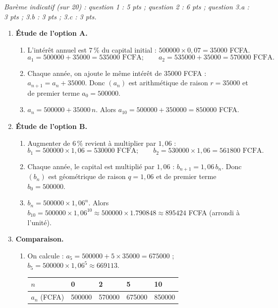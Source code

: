 \documentclass[11pt]{article}
\begin{document}
\begin{corrige}
\emph{Barème indicatif (sur 20) : question 1 : 5 pts ; question 2 : 6 pts ; question 3.a : 3 pts ; 3.b : 3 pts ; 3.c : 3 pts.}
\begin{enumerate}
\item \textbf{Étude de l'option A.}
\begin{enumerate}
\item L'intérêt annuel est $7\,\%$ du capital initial : $\num{500000}\times 0,07 = \num{35000}$ FCFA.
\[ a_1 = \num{500000} + \num{35000} = \num{535000} \text{ FCFA} ; \qquad a_2 = \num{535000} + \num{35000} = \num{570000} \text{ FCFA}. \]
\item Chaque année, on ajoute le même intérêt de \num{35000} FCFA : $a_{n+1} = a_n + \num{35000}$. Donc $(a_n)$ est arithmétique de raison $r = \num{35000}$ et de premier terme $a_0 = \num{500000}$.
\item $a_n = \num{500000} + \num{35000}\,n$. Alors $a_{10} = \num{500000} + \num{350000} = \num{850000}$ FCFA.
\end{enumerate}
\item \textbf{Étude de l'option B.}
\begin{enumerate}
\item Augmenter de $6\,\%$ revient à multiplier par $1,06$ :
\[ b_1 = \num{500000}\times 1,06 = \num{530000} \text{ FCFA} ; \qquad b_2 = \num{530000}\times 1,06 = \num{561800} \text{ FCFA}. \]
\item Chaque année, le capital est multiplié par $1,06$ : $b_{n+1} = 1,06\,b_n$. Donc $(b_n)$ est géométrique de raison $q = 1,06$ et de premier terme $b_0 = \num{500000}$.
\item $b_n = \num{500000}\times 1,06^n$. Alors $b_{10} = \num{500000}\times 1,06^{10} \approx \num{500000}\times \num{1,790848} \approx \num{895424}$ FCFA (arrondi à l'unité).
\end{enumerate}
\item \textbf{Comparaison.}
\begin{enumerate}
\item On calcule : $a_5 = \num{500000} + 5\times\num{35000} = \num{675000}$ ; $b_5 = \num{500000}\times 1,06^5 \approx \num{669113}$.
\begin{center}
\begin{tabularx}{\linewidth}{|l|X|X|X|X|}\hline
$n$ & 0 & 2 & 5 & 10 \\ \hline
$a_n$ (FCFA) & \num{500000} & \num{570000} & \num{675000} & \num{850000} \\ \hline

\end{tabularx}
\end{center}
\end{enumerate}
\end{enumerate}
\end{corrige}
\end{document}
